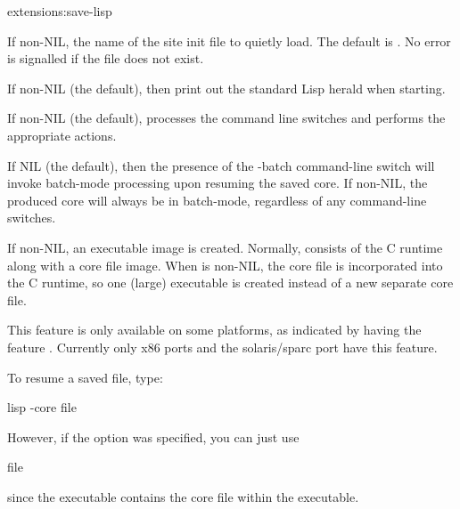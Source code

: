 \begin{defun}{extensions:}{save-lisp}
\begin{Lentry}
  \item[\kwd{site-init}] If non-NIL, the name of the site init file to
    quietly load.  The default is .  No error
    is signalled if the file does not exist.
    
  \item[\kwd{print-herald}] If non-NIL (the default), then print out
    the standard Lisp herald when starting.
    
  \item[\kwd{process-command-line}] If non-NIL (the default),
    processes the command line switches and performs the appropriate
    actions.

  \item[\kwd{batch-mode}] If NIL (the default), then the presence of
    the -batch command-line switch will invoke batch-mode processing
    upon resuming the saved core.  If non-NIL, the produced core will
    always be in batch-mode, regardless of any command-line switches.

  \item[\kwd{executable}] If non-NIL, an executable image is created.
    Normally, \cmucl{} consists of the C runtime along with a core
    file image.  When  is non-NIL, the core file is
    incorporated into the C runtime, so one (large) executable is
    created instead of a new separate core file.

    This feature is only available on some platforms, as indicated by
    having the feature .  Currently only x86 ports and
    the solaris/sparc port have this feature.
  \end{Lentry}
\end{defun}

To resume a saved file, type:
\begin{example}
lisp -core file
\end{example}
However, if the  option was specified, you can just
use
\begin{example}
  file
\end{example}
since the executable contains the core file within the executable.

